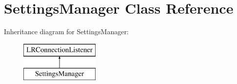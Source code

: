 \hypertarget{class_settings_manager}{}\section{Settings\+Manager Class Reference}
\label{class_settings_manager}
Inheritance diagram for Settings\+Manager\+:\begin{figure}[H]
\begin{center}
\leavevmode
\includegraphics[height=2.000000cm]{class_settings_manager}
\end{center}
\end{figure}
